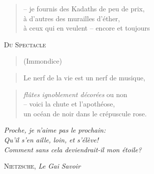   \begin{verse}
    -- je fournis des Kadaths de peu de prix,\\
    à d’autres des murailles d’éther,\\
    à ceux qui en veulent -- encore et toujours
  \end{verse}
  \begin{center}
    \textsc{Du Spectacle}
  \end{center}
  \begin{verse}
    (Immondice)
  \end{verse}
  \begin{verse}
    Le nerf de la vie est un nerf de musique,
  \end{verse}
  \begin{verse}
    \emph{flûtes ignoblement décorées} ou non\\
    -- voici la chute et l’apothéose,\\
    un océan de noir dans le crépuscule rose.
  \end{verse}
  \begin{center}
    \textit{
      Proche, je n’aime pas le prochain:\\
      Qu’il s’en aille, loin, et s’élève!\\
      Comment sans cela deviendrait-il mon étoile?
    }

    \textsc{Nietzsche}, \emph{Le Gai Savoir}
  \end{center}

